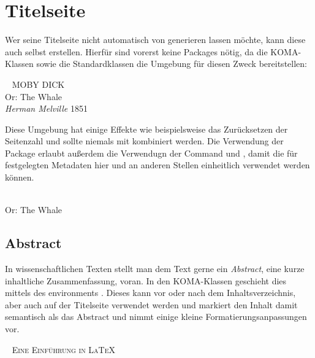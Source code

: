 \section{Titelseite}
Wer seine Titelseite nicht automatisch von  generieren lassen möchte, kann diese auch selbst erstellen.
Hierfür sind vorerst keine Packages nötig, da die KOMA-Klassen sowie die Standardklassen die Umgebung  für diesen Zweck bereitstellen:
\begin{latexlisting}
	\begin{titlepage}
		\centering
		~\vfill
		{
			\Huge
			\scshape
			MOBY DICK
		}\\
		\bigskip
		{
			\Large
			Or: The Whale
		}\\
		\vspace{2cm}
		{
			\itshape
			Herman Melville
		}
		\vfill
		1851
	\end{titlepage}
\end{latexlisting}
Diese Umgebung hat einige Effekte wie beispielsweise das Zurücksetzen der Seitenzahl und sollte niemals mit  kombiniert werden.
Die Verwendung der Package  erlaubt außerdem die Verwendugn der Command  und , damit die für  festgelegten Metadaten hier  und an anderen Stellen einheitlich verwendet werden können.
\begin{latexlisting}
	\begin{titlepage}
		\centering
		~\vfill
		{
			\Huge
			\thetitle
		}\\
		\bigskip
		{
			\Large
			Or: The Whale
		}\\
		\vspace{2cm}
		{
			\itshape
			\theautor
		}
		\vfill
		\thedate
	\end{titlepage}
\end{latexlisting}

\subsection{Abstract}
In wissenschaftlichen Texten stellt man dem Text gerne ein \emph{Abstract}, eine kurze inhaltliche Zusammenfassung, voran.
In den KOMA-Klassen geschieht dies mittels des environments .
Dieses kann vor oder nach dem Inhaltsverzeichnis, aber auch auf der Titelseite verwendet werden und markiert den Inhalt damit semantisch als das Abstract und nimmt einige kleine Formatierungsanpassungen vor.
\begin{latexlisting}
	\begin{titlepage}
		\centering
		~\vfill
		{
			\Huge
			\scshape
			Eine Einführung in \LaTeX{}
		}
		\vfill
		\begin{abstract}
			In diesem Dokument diskutieren wir Grundlagen der Textsatzprogrammsammlung \LaTeX{}.
		\end{abstract}
		\vfill
	\end{titlepage}
\end{latexlisting}

